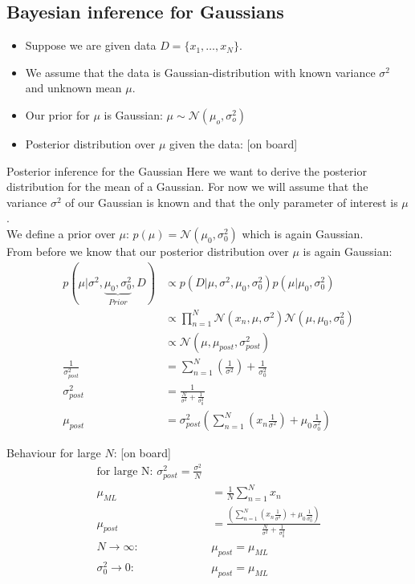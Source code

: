 \subsection{Bayesian inference for Gaussians}

\begin{itemize}
\item Suppose we are given data $D=\{x_1, \ldots, x_N\}$. 
\item We assume that the data is Gaussian-distribution with known variance $\sigma^2$ and unknown mean $\mu$.
\item Our prior for $\mu$ is Gaussian: $\mu \sim \mathcal{N}(\mu_o, \sigma^2_o)$
\item Posterior distribution over $\mu$ given the data: [on board] 
\end{itemize}

\begin{bbbox}{Posterior inference for the Gaussian}
	Here we want to derive the posterior  distribution for the mean of a Gaussian. For now we will assume that the variance $\sigma^2$ of our Gaussian is known and that the only parameter of interest is $\mu$. \\
	We define a prior over $\mu$:   $p(\mu) = \mathcal{N}(\mu_0, \sigma^2_0)$ which is again Gaussian. \\
	From before we know that our posterior distribution over $\mu$ is again Gaussian:
	\begin{align*}
		p(\mu|\sigma^2, \underbrace{\mu_0, \sigma_0^2}_{Prior},D)	
		            &\propto p(D|\mu,\sigma^2,\mu_0, \sigma_0^2) p(\mu|\mu_0, \sigma_0^2) \\
		            &\propto \prod_{n=1}^N \mathcal{N}(x_n,\mu,\sigma^2) \mathcal{N}(\mu,\mu_0, \sigma_0^2) \\
		            &\propto \mathcal{N}(\mu,\mu_{post},\sigma_{post}^2) \\
		\frac{1}{\sigma_{post}^2} &= \sum_{n=1}^N \left(\frac{1}{\sigma^2} \right) + \frac{1}{\sigma_0^2} \\
		\sigma_{post}^2 &= \frac{1}{\frac{N}{\sigma^2} + \frac{1}{\sigma_0^2}} \\
		\mu_{post} &= \sigma_{post}^2 \left( \sum_{n=1}^N \left( x_n\frac{1}{\sigma^2} \right) + \mu_0 \frac{1}{\sigma_0^2} \right)
	\end{align*}
	
Behaviour for large $N$: [on board]
\begin{align*}
	\text{for large N: } \sigma_{post}^2 = \frac{\sigma^2}{N} \\
	\mu_{ML} &= \frac{1}{N} \sum_{n=1}^N x_n \\
	\mu_{post} &= \frac{\left( \sum_{n=1}^N \left( x_n\frac{1}{\sigma^2} \right) + \mu_0 \frac{1}{\sigma_0^2} \right)}{\frac{N}{\sigma^2} + \frac{1}{\sigma_0^2}} \\
	N \rightarrow \infty: &\mu_{post} = \mu_{ML} \\
	\sigma_0^2 \rightarrow 0: &\mu_{post} = \mu_{ML} \\
\end{align*}

\end{bbbox}

